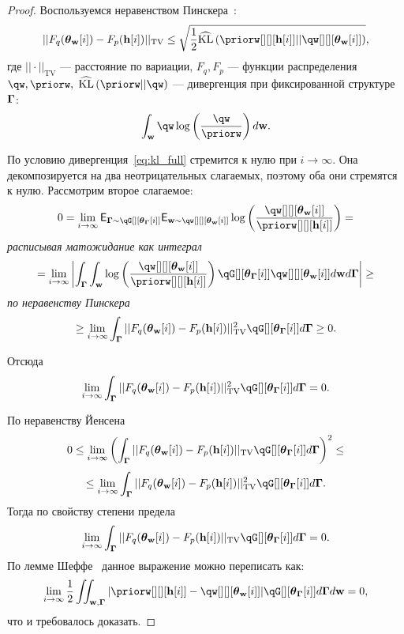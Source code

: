 \begin{proof}
Воспользуемся неравенством Пинскера~\cite{pinsker}:
\[
    ||F_q(\tetaw[i])-F_p(\h[i])||_\text{TV}\leq\sqrt{\frac{1}{2}\widehat{\text{KL}}\left(\priorw[][][{\h[i]}]||\qw[][][{\tetaw[i]}]\right)},
\]
где $||\cdot||_\text{TV}$ --- расстояние по вариации, $F_q, F_p$ --- функции распределения  $\qw,\priorw,$  $\widehat{\text{KL}}\left(\priorw||\qw\right)$ --- дивергенция при фиксированной структуре $\boldsymbol{\Gamma}$:
\[
   \int_{\w} \qw \log \left(\frac{\qw}{\priorw}\right) d\w.
\]

По условию дивергенция~\eqref{eq:kl_full} стремится к нулю при $i \to \infty$. Она декомпозируется на два  неотрицательных слагаемых, поэтому оба они стремятся к нулю.
Рассмотрим второе слагаемое:
\[
  0 =   \lim_{i \to \infty} \E_{\G \sim \qG[][{\tetaG[i]}]} \E_{\w \sim \qw[][][{\tetaw[i]}]} \log \left(\frac{\qw[][][{\tetaw[i]}]}{\priorw[][][{\h[i]}]}\right) = 
\]
\textit{расписывая матожидание как интеграл}
\[
 =  \lim_{i \to \infty} \left|\int_{\G} \int_{\w} \log \left(\frac{\qw[][][{\tetaw[i]}]}{\priorw[][][{\h[i]}]}\right)\qG[][{\tetaG[i]}]\qw[][][{\tetaw[i]}] d\w d\G \right| \geq  
\]
\textit{по неравенству Пинскера}
\[
\geq \lim_{i \to \infty}  \int_{\G} ||F_q({\tetaw[i]})-F_p({\h[i]})||^2_\text{TV}\qG[][{\tetaG[i]}] d\G \geq 0.  
\]

Отсюда
\[
\lim_{i \to \infty}  \int_{\G} ||F_q({\tetaw[i]})-F_p({\h[i]})||^2_\text{TV}\qG[][{\tetaG[i]}] d\G = 0.
\]

По неравенству Йенсена 
\[
0 \leq \lim_{i \to \infty}  \left(\int_{\G} ||F_q({\tetaw[i]})-F_p({\h[i]})||_\text{TV}\qG[][{\tetaG[i]}] d\G\right)^2 \leq
\]
\[
 \leq  \lim_{i \to \infty}  \int_{\G} ||F_q({\tetaw[i]})-F_p({\h[i]})||^2_\text{TV}\qG[][{\tetaG[i]}] d\G.
\]
Тогда по свойству степени предела $$\lim_{i \to \infty} \int_{\G}||F_q({\tetaw[i]})-F_p({\h[i]})||_\text{TV} \qG[][{\tetaG[i]}] d\G = 0.$$
По лемме Шеффе~\cite{scheffe} данное выражение можно переписать как:
\begin{equation}
\label{eq:sheffe}
    \lim_{i \to \infty}   \frac{1}{2}\iint_{\w,\G} |\priorw[][][{\h[i]}] - \qw[][][{\tetaw[i]}]| \qG[][{\tetaG[i]}] d\G d\w = 0,
\end{equation}
что и требовалось доказать.
\end{proof}




